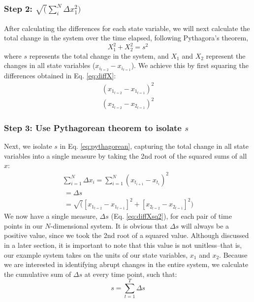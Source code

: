 \documentclass[12pt,twoside,openany]{reedthesis}
\begin{document}
\subsubsection{\texorpdfstring{Step 2:
\(\sqrt(\sum_i^N\Delta x_1^2)\)}{Step 2: \textbackslash{}sqrt(\textbackslash{}sum\_i\^{}N\textbackslash{}Delta x\_1\^{}2)}}\label{step-2-sqrtsum_indelta-x_12}

After calculating the differences for each state variable, we will next
calculate the total change in the system over the time elapsed,
following Pythagora's theorem,
\begin{equation}
 X_1^2 + X_2^2 = s^2 
  \label{eq:pythagorean}
\end{equation}
where \(s\) represents the total change in the system, and \(X_1\) and
\(X_2\) represent the changes in all state variables
(\(x_{i_{t=2}} - x_{i_{t=1}}\)). We achieve this by first squaring the
differences obtained in Eq. \eqref{eq:diffX}:
\begin{equation}
\begin{array}{rcr}
(x_{1_{t=2}} - x_{1_{t=1}})^2  \\
(x_{2_{t=2}} - x_{2_{t=1}})^2 
\end{array}
  \label{eq:diffXsq}
\end{equation}
\subsubsection{\texorpdfstring{Step 3: Use Pythagorean theorem to
isolate
\(s\)}{Step 3: Use Pythagorean theorem to isolate s}}\label{step-3-use-pythagorean-theorem-to-isolate-s}

Next, we isolate \(s\) in Eq. \eqref{eq:pythagorean}, capturing the total
change in all state variables into a single measure by taking the 2nd
root of the squared sums of all \(x\):
\begin{equation}
\begin{array}{rcr}
\sum_{i=1}^{N} \Delta {x_i} = \sum_{i=1}^{N}(x_{t_{i+1}} - x_{t_i})^2 \\ 
\ = \Delta s \\ 
\ = \sqrt([x_{1_{t=2}} - x_{1_{t=1}}]^2 + [x_{2_{t=2}} - x_{2_{t=1}}]^2)
\end{array}
\label{eq:diffXsq2}
\end{equation}
We now have a single measure, \(\Delta s\) (Eq. \eqref{eq:diffXsq2}), for
each pair of time points in our \(N\)-dimensional system. It is obvious
that \(\Delta s\) will always be a positive value, since we took the 2nd
root of a squared value. Although discussed in a later section, it is
important to note that this value is not unitless--that is, our example
system takes on the units of our state variables, \(x_1\) and \(x_2\).
Because we are interested in identifying abrupt changes in the entire
system, we calculate the cumulative sum of \(\Delta s\) at every time
point, such that:
\begin{equation}
s = \sum_{t=1}^T \Delta s
\label{eq:s}
\end{equation}
\end{document}
